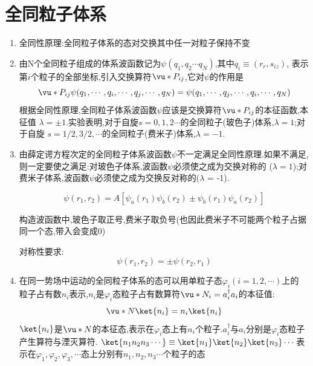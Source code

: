     \section{全同粒子体系}

        \begin{formal}
        \begin{enumerate}
            \item 全同性原理:全同粒子体系的态对交换其中任一对粒子保持不变
            \item 由N个全同粒子组成的体系波函数记为$\psi(q_{1},q_{2}\cdots q_{N})$,其中$q_{i} \equiv (r_{r},s_{iz})$,
                  表示第$i$个粒子的全部坐标,引入交换算符$\vu*{P}_{ij}$,它对$\psi$的作用是
                  $$
                  \vu*{P}_{ij} \psi(q_{1},\cdots,q_{i},\cdots,q_{j},\cdots,q_{N}) = \psi(q_{1},\cdots,q_{j},\cdots,q_{i},\cdots,q_{N})
                  $$
                  根据全同性原理,全同粒子体系波函数$\psi$应该是交换算符$\vu*{P}_{ij}$的本征函数,本征值
                  $\lambda=\pm 1$.实验表明,对于自旋$s=0,1,2\cdots$的全同粒子(玻色子)体系,$\lambda=1$;对于自旋
                  $s = 1/2,3/2,\cdots$的全同粒子(费米子)体系,$\lambda=-1$.

            \item 由薛定谔方程次定的全同粒子体系波函数$\psi$不一定满足全同性原理.如果不满足,则一定要使之满足:对玻色子体系,波函数$\psi$必须使之成为交换对称的
                  ($\lambda=1$);对费米子体系,波函数$\psi$必须使之成为交换反对称的($\lambda$ = -1).

                  $$
                  \psi(r_{1},r_{2}) = A [ \psi_{a}(r_{1}) \psi_{b}(r_{2}) \pm \psi_{b}(r_{1}) \psi_{a}(r_{2}) ]
                  $$

                  构造波函数中,玻色子取正号,费米子取负号(也因此费米子不可能两个粒子占据同一个态,带入会变成0)

                  对称性要求:
                  $$
                  \psi(r_{1},r_{2}) = \pm \psi(r_{2},r_{1})
                  $$
                  

            \item 在同一势场中运动的全同粒子体系的态可以用单粒子态$\varphi_{i}(i=1,2,\cdots)$上的
                  粒子占有数$n_{i}$表示,$n_{i}$是$\varphi_{i}$态粒子占有数算符$\vu*{N}_{i}=a^{\dagger}_{i}a_{i}$的本征值:
                  $$ \vu*{N}\ket{n_{i}} = n_{i} \ket{n_{i}} $$
                  $\ket{n_{i}}$是$\vu*{N}$的本征态,表示在$\varphi_{i}$态上有$n_{i}$个粒子.$a_{i}^{\dagger}$与$a_{i}$分别是$\varphi_{i}$态粒子
                  产生算符与湮灭算符. $ \ket{n_{1}n_{2}n_{3}\cdots} \equiv \ket{n_{1}} \ket{n_{2}} \ket{n_{3}} \cdots 
                  $表示在$\varphi_{1},\varphi_{2},\varphi_{3},\cdots$态上分别有$n_{1},n_{2},n_{3} \cdots$个粒子的态  
                  

\end{enumerate}
\end{formal}

